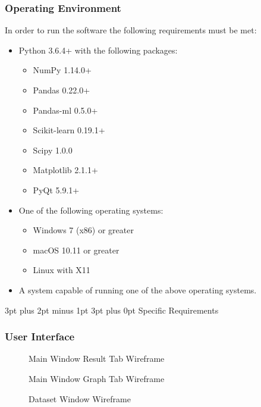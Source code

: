 \documentclass[12pt,a4paper]{article}
\makeatletter
\renewcommand\subsection{\@startsection {subsection}{1}{2mm} %
                               {3pt plus 2pt minus 1pt} %
                               {3pt plus 0pt} %
                               {\normalfont\bfseries}}
\makeatother
\begin{document}
\subsubsection{Operating Environment}
In order to run the software the following requirements must be met:
\begin{itemize}
	\item{Python 3.6.4+ with the following packages:}
	\begin{itemize}
		\item{NumPy 1.14.0+}
		\item{Pandas 0.22.0+}
		\item{Pandas-ml 0.5.0+}
		\item{Scikit-learn 0.19.1+}
		\item{Scipy 1.0.0}
		\item{Matplotlib 2.1.1+}
		\item{PyQt 5.9.1+}
	\end{itemize}
\item{One of the following operating systems:}
	\begin{itemize}
		\item{Windows 7 (x86) or greater}
		\item{macOS 10.11 or greater}
		\item{Linux with X11}
	\end{itemize}
	\item{A system capable of running one of the above operating systems.}
\end{itemize}

\subsection{Specific Requirements}
\subsubsection{User Interface}
\begin{figure}[H]
\caption{Main Window Result Tab Wireframe}
\label{mainwf}
\end{figure}
\begin{figure}[H]
\caption{Main Window Graph Tab Wireframe}
\label{graphwf}
\end{figure}
\begin{figure}[H]
\caption{Dataset Window Wireframe}
\label{datasetwf}
\end{figure}
\end{document}

